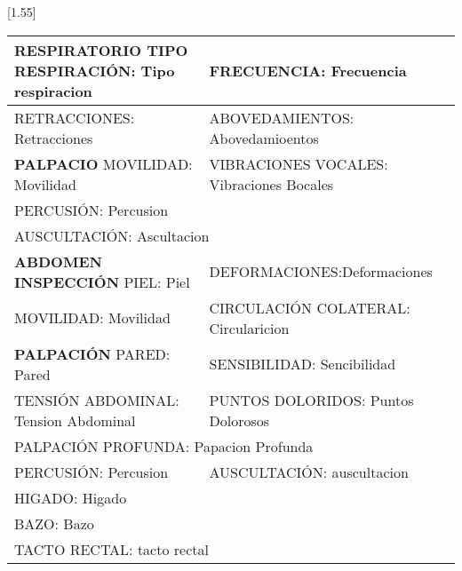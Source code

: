 \documentclass[10pt,a4paper]{article}
\begin{document}
\vspace{0.5cm}
\scalebox{1.4}[1.55]{
\begin{tabular}{|p{5.5cm} p{5.5cm} |}
\hline
\scriptsize{\textbf{RESPIRATORIO  }TIPO RESPIRACI\'ON: Tipo respiracion} & \scriptsize{FRECUENCIA: Frecuencia}\\
\hline
\scriptsize{RETRACCIONES: Retracciones} & \scriptsize{ABOVEDAMIENTOS: Abovedamioentos} \\
\hline
\scriptsize{\textbf{PALPACIO  }MOVILIDAD: Movilidad}& \scriptsize{VIBRACIONES VOCALES: Vibraciones Bocales}\\
\hline 
\multicolumn{2}{|l|}{\begin{minipage}[t]{12.5 cm}\scriptsize{PERCUSI\'ON: Percusion}\end{minipage}}\\
\hline
\multicolumn{2}{|l|}{\begin{minipage}[t]{12.5 cm}\scriptsize{AUSCULTACI\'ON: Ascultacion}\end{minipage}}\\
\hline
\scriptsize{\textbf{ABDOMEN INSPECCI\'ON  }PIEL: Piel} & \scriptsize{DEFORMACIONES:Deformaciones} \\
\hline
\scriptsize{MOVILIDAD: Movilidad } & \scriptsize{CIRCULACI\'ON COLATERAL: Circularicion}\\
\hline
\scriptsize{\textbf{PALPACI\'ON}  PARED: Pared} & \scriptsize{SENSIBILIDAD: Sencibilidad}\\
\hline
\scriptsize{TENSI\'ON ABDOMINAL: Tension Abdominal } & \scriptsize{PUNTOS DOLORIDOS: Puntos Dolorosos} \\
\hline
\multicolumn{2}{|l|}{\begin{minipage}[t]{12.5 cm}\scriptsize{PALPACI\'ON PROFUNDA: Papacion Profunda}\end{minipage}}\\
\hline
\scriptsize{PERCUSI\'ON: Percusion} & \scriptsize{AUSCULTACI\'ON: auscultacion} \\
\hline
\multicolumn{2}{|l|}{\begin{minipage}[t]{12.5 cm}\scriptsize{HIGADO: Higado}\end{minipage}}\\
\hline
\multicolumn{2}{|l|}{\begin{minipage}[t]{12.5 cm}\scriptsize{BAZO: Bazo}\end{minipage}}\\
\hline
\multicolumn{2}{|l|}{\begin{minipage}[t]{12.5 cm}\scriptsize{TACTO RECTAL: tacto rectal}\end{minipage}}\\

\end{tabular}}
\end{document}
